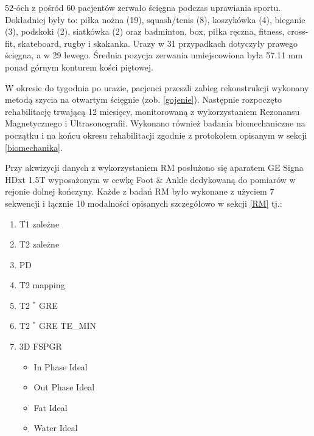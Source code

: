 52-óch z pośród 60 pacjentów zerwało ścięgna podczas uprawiania sportu. Dokładniej były to: piłka nożna (19), squash/tenis (8), koszykówka (4), bieganie (3), podskoki (2), siatkówka (2) oraz badminton, box, piłka ręczna, fitness, cross-fit, skateboard, rugby i skakanka. Urazy w 31 przypadkach dotyczyły prawego ścięgna, a w 29 lewego. Średnia pozycja zerwania umiejscowiona była 57.11 mm ponad górnym konturem kości piętowej.

W okresie do tygodnia po urazie, pacjenci przeszli zabieg rekonstrukcji wykonany metodą szycia na otwartym ścięgnie (zob. \ref{gojenie}). Następnie rozpoczęto rehabilitację trwającą 12 miesięcy, monitorowaną z wykorzystaniem Rezonansu Magnetycznego i Ultrasonografii. Wykonano również badania biomechaniczne na początku i na końcu okresu rehabilitacji zgodnie z protokołem opisanym w sekcji \ref{biomechanika}.

Przy akwizycji danych z wykorzystaniem RM posłużono się aparatem GE Signa HDxt 1.5T wyposażonym w cewkę Foot \& Ankle dedykowaną do pomiarów w rejonie dolnej kończyny. Każde z badań RM było wykonane z użyciem 7 sekwencji i łącznie 10 modalności opisanych szczegółowo w sekcji \ref{RM} tj.:
\begin{enumerate}
	\item T1 zależne
	\item T2 zależne
	\item PD
	\item T2 mapping
	\item T2 $^\ast$ GRE
	\item T2 $^\ast$ GRE TE\_MIN
	\item 3D FSPGR
	\begin{itemize}
		\item In Phase Ideal
		\item Out Phase Ideal
		\item Fat Ideal
		\item Water Ideal 
	\end{itemize}
\end{enumerate}

